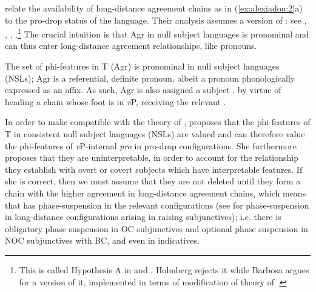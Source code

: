 \documentclass[output=paper]{langsci/langscibook}
\begin{document}
\begin{exe}%
    \z
\end{exe}


\citet{Tsakali2017} relate the availability of long-distance agreement chains as in (\ref{ex:alexiadou:2}a) to the pro-drop status of the language. Their analysis assumes a version of : see \citet{Rizzi1982}, \citet{Alexiadou1998}, \citet{Holmberg2005}, \citet{Barbosa2009}.\footnote{This is called Hypothesis A in \citet{Holmberg2005} and \citet{Barbosa2009}. Holmberg rejects it while Barbosa argues for a version of it, implemented in terms of  modification of  theory of .} The crucial intuition is that Agr in null subject languages is pronominal and can thus enter long-distance agreement relationships, like pronouns.

\ea%
    \label{ex:alexiadou:30}
    The set of phi-features in T (Agr) is pronominal in null subject languages (NSLs); Agr is a referential, definite pronoun, albeit a pronoun phonologically expressed as an affix. As such, Agr is also assigned a subject , by virtue of heading a chain whose foot is in \textit{v}P, receiving the relevant .
    \z

          

In order to make  compatible with the theory of , \citet{Barbosa2009} proposes that the phi-features of T in consistent null subject languages (NSLs) are valued and can therefore value the phi-features of \textit{v}P-internal \textit{pro} in pro-drop configurations. She furthermore proposes that they are uninterpretable, in order to account for the  relationship they establish with overt or covert subjects which have interpretable features. If she is correct, then we must assume that they are not deleted until they form a chain with the higher agreement in long-distance agreement chains, which means that  has phase-suspension in the relevant configurations (see \citealt{Alexiadou2014} for phase-suspension in long-distance  configurations arising in raising subjunctives); i.e. there is obligatory phase suspension in OC subjunctives and optional phase suspension in NOC subjunctives with BC, and even in indicatives.  
\end{document}
